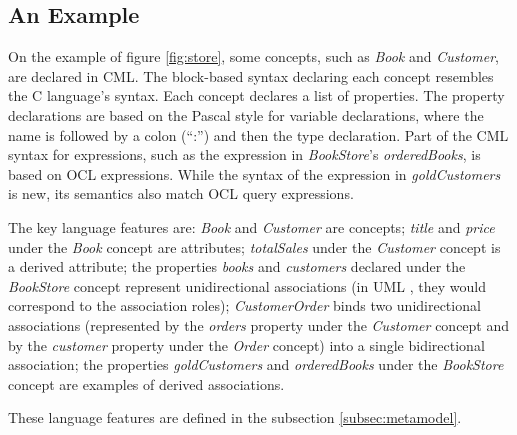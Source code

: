 \subsection{An Example}\label{subsec:example}

On the example of figure \ref{fig:store}, some concepts, such as \emph{Book} and \emph{Customer}, are declared in CML.
The block-based syntax declaring each concept resembles the C \cite{clang} language's syntax.
Each concept declares a list of properties.
The property declarations are based on the Pascal \cite{pascal} style for variable declarations,
where the name is followed by a colon (``:'') and then the type declaration.
Part of the CML syntax for expressions, such as the expression in \emph{BookStore}'s \emph{orderedBooks}, is based on OCL \cite{ocl} expressions.
While the syntax of the expression in \emph{goldCustomers} is new,
its semantics also match OCL \cite{ocl} query expressions.



The key language features are:
\emph{Book} and \emph{Customer} are concepts;
\emph{title} and \emph{price} under the \emph{Book} concept are attributes;
\emph{totalSales} under the \emph{Customer} concept is a derived attribute;
the properties \emph{books} and \emph{customers}
declared under the \emph{BookStore} concept
represent unidirectional associations
(in UML \cite{uml}, they would correspond to the association roles);
\emph{CustomerOrder} binds two unidirectional associations
(represented by the \emph{orders} property under the \emph{Customer} concept
and by the \emph{customer} property under the \emph{Order} concept)
into a single bidirectional association;
the properties \emph{goldCustomers} and \emph{orderedBooks}
under the \emph{BookStore} concept are examples of derived associations.

These language features are defined in the subsection \ref{subsec:metamodel}.
